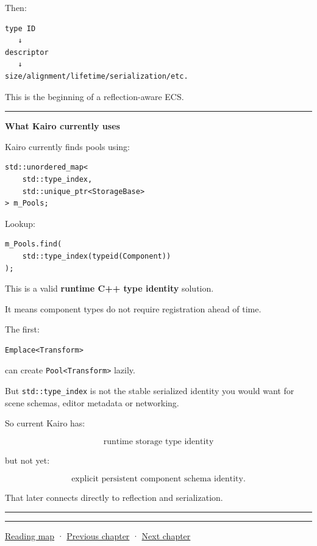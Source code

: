 Then:

\begin{verbatim}
type ID
   ↓
descriptor
   ↓
size/alignment/lifetime/serialization/etc.
\end{verbatim}

This is the beginning of a reflection-aware ECS.

\begin{center}\rule{0.5\linewidth}{0.5pt}\end{center}

\textbf{What Kairo currently uses}

Kairo currently finds pools using:

\begin{verbatim}
std::unordered_map<
    std::type_index,
    std::unique_ptr<StorageBase>
> m_Pools;
\end{verbatim}

Lookup:

\begin{verbatim}
m_Pools.find(
    std::type_index(typeid(Component))
);
\end{verbatim}

This is a valid \textbf{runtime C++ type identity} solution.

It means component types do not require registration ahead of time.

The first:

\begin{verbatim}
Emplace<Transform>
\end{verbatim}

can create \texttt{Pool\textless{}Transform\textgreater{}} lazily.

But \texttt{std::type\_index} is not the stable serialized identity you would want for scene schemas, editor metadata or networking.

So current Kairo has:

\[
\boxed{
\text{runtime storage type identity}
}
\]

but not yet:

\[
\boxed{
\text{explicit persistent component schema identity}.
}
\]

That later connects directly to reflection and serialization.

\begin{center}\rule{0.5\linewidth}{0.5pt}\end{center}

\begin{center}\rule{0.5\linewidth}{0.5pt}\end{center}

\hyperref[volume-reading-map]{Reading map} · \hyperref[05-engine-i-ch013-portable-startup-windows-events-and-input]{Previous chapter} · \hyperref[05-engine-i-ch015-sparse-set-components-and-generational-entity-handles]{Next chapter}
